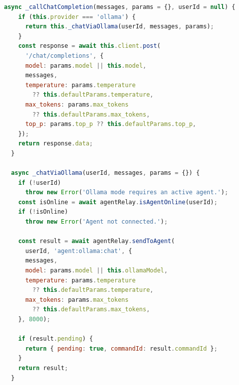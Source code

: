\begin{lstlisting}[language=JavaScript, caption={llmService.js -- Chat Completion และ Ollama Relay}]
  async _callChatCompletion(messages, params = {}, userId = null) {
    if (this.provider === 'ollama') {
      return this._chatViaOllama(userId, messages, params);
    }
    const response = await this.client.post(
      '/chat/completions', {
      model: params.model || this.model,
      messages,
      temperature: params.temperature
        ?? this.defaultParams.temperature,
      max_tokens: params.max_tokens
        ?? this.defaultParams.max_tokens,
      top_p: params.top_p ?? this.defaultParams.top_p,
    });
    return response.data;
  }

  async _chatViaOllama(userId, messages, params = {}) {
    if (!userId)
      throw new Error('Ollama mode requires an active agent.');
    const isOnline = await agentRelay.isAgentOnline(userId);
    if (!isOnline)
      throw new Error('Agent not connected.');

    const result = await agentRelay.sendToAgent(
      userId, 'agent:ollama:chat', {
      messages,
      model: params.model || this.ollamaModel,
      temperature: params.temperature
        ?? this.defaultParams.temperature,
      max_tokens: params.max_tokens
        ?? this.defaultParams.max_tokens,
    }, 8000);

    if (result.pending) {
      return { pending: true, commandId: result.commandId };
    }
    return result;
  }
\end{lstlisting}


